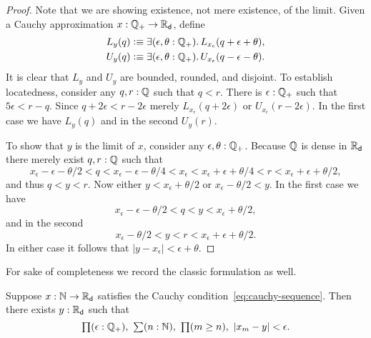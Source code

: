 \begin{proof}
  Note that we are showing existence, not mere existence, of the limit.
  Given a Cauchy approximation $x : \mathbb{Q}_{+} \to \mathbb{R}_\mathsf{d}$, define
  \begin{align*}
    L_y(q) &\defeq \exis{\epsilon, \theta : \Qp} L_{x_\epsilon}(q + \epsilon + \theta),\\
    U_y(q) &\defeq \exis{\epsilon, \theta : \Qp} U_{x_\epsilon}(q - \epsilon - \theta).
  \end{align*}
  It is clear that $L_y$ and $U_y$ are bounded, rounded, and disjoint. To establish
  locatedness, consider any $q, r : \mathbb{Q}$ such that $q < r$. There is $\epsilon : \mathbb{Q}_{+}$ such
  that $5 \epsilon < r - q$. Since $q + 2 \epsilon < r - 2 \epsilon$ merely
  $L_{x_\epsilon}(q + 2 \epsilon)$ or $U_{x_\epsilon}(r - 2 \epsilon)$. In the first case
  we have $L_y(q)$ and in the second $U_y(r)$.

  To show that $y$ is the limit of $x$, consider any $\epsilon, \theta : \mathbb{Q}_{+}$. Because
  $\mathbb{Q}$ is dense in $\mathbb{R}_\mathsf{d}$ there merely exist $q, r : \mathbb{Q}$ such that
  \begin{equation*}
    x_\epsilon - \epsilon - \theta/2 < q < x_\epsilon - \epsilon - \theta/4
    < x_\epsilon <
    x_\epsilon + \epsilon + \theta/4 < r < x_\epsilon + \epsilon + \theta/2,
  \end{equation*}
  and thus $q < y < r$. Now either $y < x_\epsilon + \theta/2$ or $x_\epsilon - \theta/2 < y$.
  In the first case we have
  \begin{equation*}
    x_\epsilon - \epsilon - \theta/2 < q < y < x_\epsilon + \theta/2,
  \end{equation*}
  and in the second
  \begin{equation*}
    x_\epsilon - \theta/2 < y < r < x_\epsilon + \epsilon + \theta/2.
  \end{equation*}
  In either case it follows that $|y - x_\epsilon| < \epsilon + \theta$.
\end{proof}

For sake of completeness we record the classic formulation as well.

\begin{cor}
  Suppose $x : \mathbb{N} \to \mathbb{R}_\mathsf{d}$ satisfies the Cauchy condition~\eqref{eq:cauchy-sequence}. Then
  there exists $y : \mathbb{R}_\mathsf{d}$ such that
  \begin{equation*}
    \prd{\epsilon : \Qp} \sm{n : \N} \prd{m \geq n} |x_m - y| < \epsilon.
  \end{equation*}
\end{cor}

